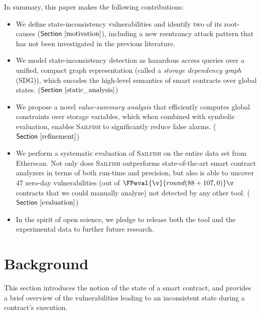 \documentclass[conference, romanappendices]{tex/IEEEtran}
\theoremstyle{bfnote}
\newcommand{\toolname}{\textsc{Sailfish}\xspace}
\newcommand{\smart}{smart contract}
\newcommand{\etherscan}{{\sc Etherscan}\xspace}
\newcommand{\reentrancy}{{reentrancy}\xspace}
\newcommand{\haz}{{hazardous access}\xspace}
\newcommand{\si}{{state-inconsistency}\xspace}
\newcommand{\vsa}{{value-summary analysis}\xspace}
\newcommand{\sdg}{storage dependency graph\xspace}
\newcommand{\Sect}[1]{\ensuremath{\sf Section~\ref{#1}}}
\newcommand{\clintOnlyDAOTriage}{88}
\newcommand{\clintOnlyTODTriage}{107}
\newcommand{\zeroDays}{47}
\begin{document}
In summary, this paper makes the following contributions: 

\begin{itemize}
\item We define \si{} vulnerabilities and identify two of its root-causes (\Sect{motivation}),
including a new \reentrancy attack pattern that has not been investigated in the previous literature.

\item We model \si{} detection as \haz queries over a unified, compact graph representation (called a \emph{\sdg} ({SDG\EndAccSupp{}})), which encodes the high-level semantics of smart contracts over global states. (\Sect{static_analysis})

\item We propose a novel \emph{\vsa} that efficiently computes global constraints over storage variables, which 
when combined with symbolic evaluation, enables \toolname to significantly reduce false alarms. (\Sect{refinement})

\item We perform a systematic evaluation of \toolname on the entire data set
from \etherscan.
Not only does \toolname outperforms state-of-the-art \smart{} analyzers in terms of both run-time and precision, but also is able to uncover $\zeroDays$ zero-day vulnerabilities (out of $\FPeval{\v}{round(\clintOnlyDAOTriage+\clintOnlyTODTriage,0)}\v$ contracts that we could manually analyze) not detected by any other tool. (\Sect{evaluation})

\item In the spirit of open science, we pledge to release both the tool and the experimental data to further future research.
\end{itemize}
 	\section{Background} 
\label{background}

This section introduces the notion of the state of a \smart, and provides a brief overview of the vulnerabilities leading to an inconsistent state during a contract's execution.
\end{document}
